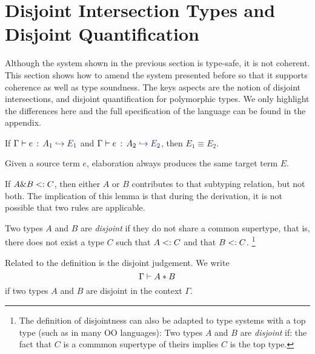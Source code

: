 \section{Disjoint Intersection Types and Disjoint Quantification}

Although the system shown in the previous section is type-safe, it is not
coherent. This section shows how to amend the system presented before so that it
supports coherence as well as type soundness. The keys aspects are the notion of
disjoint intersections, and disjoint quantification for polymorphic types. We
only highlight the differences here and the full specification of the language
can be found in the appendix.

\begin{theorem} \label{unique-elaboration}
  If $\hastype \Gamma e {A_1} \yields {E_1}$ and $\hastype \Gamma e {A_2}
  \yields {E_2}$, then $E_1 \equiv E_2$.
\end{theorem}

Given a source term $e$, elaboration always produces the same target term $E$.


If $A \& B <: C$, then either $A$ or $B$ contributes to that subtyping
relation, but not both. The implication of this lemma is that during the
derivation, it is not possible that two rules are applicable.

\begin{definition}
  Two types $A$ and $B$ are \emph{disjoint} if they do not share a common
  supertype, that is, there does not exist a type $C$ such that $A <: C$
  and that $B <: C$. \footnote{
  The definition of disjointness can also be adapted to type systems with a top
  type (such as \lstinline@Object@ in many OO languages): Two types $A$ and $B$
  are \emph{disjoint} if: the fact that $C$ is a commmon supertype of theirs
  implies $C$ is the top type.
  }
\end{definition}

Related to the definition is the disjoint judgement. We write
\[ \Gamma \vdash A * B \]
if two types $A$ and $B$ are disjoint in the context $\Gamma$.

